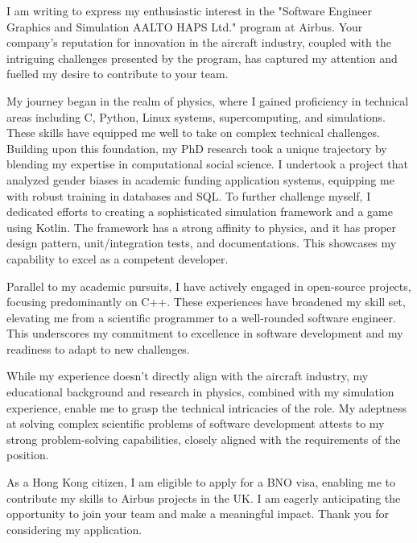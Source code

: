 \documentclass[11pt, a4paper]{awesome-cv}
\begin{document}
\makecvheader[R]

\makecvfooter
  {}%
  {}%
  {}

\makelettertitle

\begin{cvletter}

I am writing to express my enthusiastic interest in the "Software Engineer Graphics and Simulation AALTO HAPS Ltd." program at Airbus. Your company's reputation for innovation in the aircraft industry, coupled with the intriguing challenges presented by the program, has captured my attention and fuelled my desire to contribute to your team.

My journey began in the realm of physics, where I gained proficiency in technical areas including C, Python, Linux systems, supercomputing, and simulations. These skills have equipped me well to take on complex technical challenges. Building upon this foundation, my PhD research took a unique trajectory by blending my expertise in computational social science. I undertook a project that analyzed gender biases in academic funding application systems, equipping me with robust training in databases and SQL. To further challenge myself, I dedicated efforts to creating a sophisticated simulation framework and a game using Kotlin. The framework has a strong affinity to physics, and it has proper design pattern, unit/integration tests, and documentations. This showcases my capability to excel as a competent developer.

Parallel to my academic pursuits, I have actively engaged in open-source projects, focusing predominantly on C++. These experiences have broadened my skill set, elevating me from a scientific programmer to a well-rounded software engineer. This underscores my commitment to excellence in software development and my readiness to adapt to new challenges.

While my experience doesn't directly align with the aircraft industry, my educational background and research in physics, combined with my simulation experience, enable me to grasp the technical intricacies of the role. My adeptness at solving complex scientific problems of software development attests to my strong problem-solving capabilities, closely aligned with the requirements of the position.

As a Hong Kong citizen, I am eligible to apply for a BNO visa, enabling me to contribute my skills to Airbus projects in the UK. I am eagerly anticipating the opportunity to join your team and make a meaningful impact. Thank you for considering my application.

\end{cvletter}


\makeletterclosing
\end{document}
